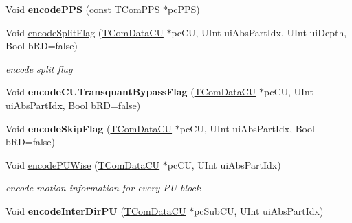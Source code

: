 \begin{DoxyCompactItemize}
\mbox{\label{class_t_enc_entropy_ac38b4e2502a9f05a8bfdb5e633e0c701}} 
Void {\bfseries encode\+P\+PS} (const \hyperlink{class_t_com_p_p_s}{T\+Com\+P\+PS} $\ast$pc\+P\+PS)
\item 
\mbox{\label{class_t_enc_entropy_a2df17266ff0c327296a004d8e5ff0b38}} 
Void \hyperlink{class_t_enc_entropy_a2df17266ff0c327296a004d8e5ff0b38}{encode\+Split\+Flag} (\hyperlink{class_t_com_data_c_u}{T\+Com\+Data\+CU} $\ast$pc\+CU, U\+Int ui\+Abs\+Part\+Idx, U\+Int ui\+Depth, Bool b\+RD=false)
\begin{DoxyCompactList}\small\item\em encode split flag \end{DoxyCompactList}\item 
\mbox{\label{class_t_enc_entropy_aeed11b8ad56e70b0551a830f1102d2ba}} 
Void {\bfseries encode\+C\+U\+Transquant\+Bypass\+Flag} (\hyperlink{class_t_com_data_c_u}{T\+Com\+Data\+CU} $\ast$pc\+CU, U\+Int ui\+Abs\+Part\+Idx, Bool b\+RD=false)
\item 
\mbox{\label{class_t_enc_entropy_aa8b2e63389197eeda0098cc80431dc7f}} 
Void {\bfseries encode\+Skip\+Flag} (\hyperlink{class_t_com_data_c_u}{T\+Com\+Data\+CU} $\ast$pc\+CU, U\+Int ui\+Abs\+Part\+Idx, Bool b\+RD=false)
\item 
\mbox{\label{class_t_enc_entropy_a331d240c56f2e9c9971aa86a40133ec7}} 
Void \hyperlink{class_t_enc_entropy_a331d240c56f2e9c9971aa86a40133ec7}{encode\+P\+U\+Wise} (\hyperlink{class_t_com_data_c_u}{T\+Com\+Data\+CU} $\ast$pc\+CU, U\+Int ui\+Abs\+Part\+Idx)
\begin{DoxyCompactList}\small\item\em encode motion information for every PU block \end{DoxyCompactList}\item 
\mbox{\label{class_t_enc_entropy_aac4b4b8a6dfe7510f5c832980fe64236}} 
Void {\bfseries encode\+Inter\+Dir\+PU} (\hyperlink{class_t_com_data_c_u}{T\+Com\+Data\+CU} $\ast$pc\+Sub\+CU, U\+Int ui\+Abs\+Part\+Idx)
\item 
\mbox{\label{class_t_enc_entropy_a418fc6da3be935bad0780f1bc25d0ea0}} 

\end{DoxyCompactItemize}
